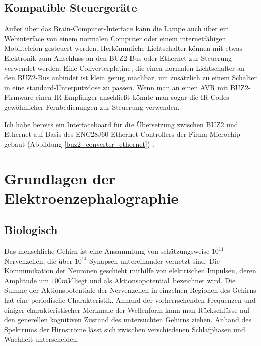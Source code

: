 \documentclass[12pt,a4paper,notitlepage]{article}
\begin{document}

\subsection{Kompatible Steuergeräte}
Außer über das Brain-Computer-Interface kann die Lampe auch über ein Webinterface von einem normalen Computer oder einem internetfähigen Mobiltelefon gesteuert werden. Herkömmliche Lichtschalter können mit etwas Elektronik zum Anschluss an den BUZ2-Bus oder Ethernet zur Steuerung verwendet werden. Eine Converterplatine, die einen normalen Lichtschalter an den BUZ2-Bus anbindet ist klein genug machbar, um zusätzlich zu einem Schalter in eine standard-Unterputzdose zu passen. Wenn man an einen AVR mit BUZ2-Firmware einen IR-Empfänger anschließt könnte man sogar die IR-Codes gewöhnlicher Fernbedienungen zur Steuerung verwenden.

Ich habe bereits ein Interfaceboard für die Übersetzung zwischen BUZ2 und Ethernet auf Basis des ENC28J60-Ethernet-Controllers der Firma Microchip gebaut (Abbildung \ref{buz2_converter_ethernet}) \cite{MICROCHIP1}.
\section{Grundlagen der Elektroenzephalographie}
\subsection{Biologisch}
Das menschliche Gehirn ist eine Ansammlung von schätzungsweise $10^{11}$ Nervenzellen, die über $10^{14}$ Synapsen untereinander vernetzt sind. Die Kommunikation der Neuronen geschieht mithilfe von elektrischen Impulsen, deren Amplitude um $100mV$ liegt und als \glqq Aktionsopotential\grqq\ bezeichnet wird. Die Summe der Aktionspotentiale der Nervenzellen in einzelnen Regionen des Gehirns hat eine periodische Charakteristik. Anhand der vorherrschenden Frequenzen und einiger charakteristischer Merkmale der Wellenform kann man Rückschlüsse auf den generellen kognitiven Zustand des untersuchten Gehirns ziehen. Anhand des Spektrums der Hirnströme lässt sich zwischen verschiedenen Schlafphasen und Wachheit unterscheiden\cite{WP14,WP15,WP16,WP17,WP18,WP19}.
\end{document}
